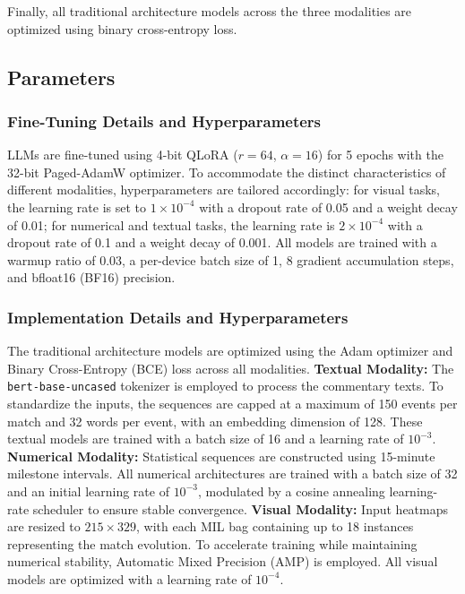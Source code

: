 Finally, all traditional architecture models across the three modalities are optimized using binary cross-entropy loss.


\subsection{Parameters}
\label{app:parameters}

\subsubsection{Fine-Tuning Details and Hyperparameters}
LLMs are fine-tuned using 4-bit QLoRA ($r=64$, $\alpha=16$) for 5 epochs with the 32-bit Paged-AdamW optimizer. To accommodate the distinct characteristics of different modalities, hyperparameters are tailored accordingly: for visual tasks, the learning rate is set to $1\times10^{-4}$ with a dropout rate of 0.05 and a weight decay of 0.01; for numerical and textual tasks, the learning rate is $2\times10^{-4}$ with a dropout rate of 0.1 and a weight decay of 0.001. All models are trained with a warmup ratio of 0.03, a per-device batch size of 1, 8 gradient accumulation steps, and bfloat16 (BF16) precision.


\subsubsection{Implementation Details and Hyperparameters}
The traditional architecture models are optimized using the Adam optimizer and Binary Cross-Entropy (BCE) loss across all modalities. \textbf{Textual Modality:} The \texttt{bert-base-uncased} tokenizer is employed to process the commentary texts. To standardize the inputs, the sequences are capped at a maximum of 150 events per match and 32 words per event, with an embedding dimension of 128. These textual models are trained with a batch size of 16 and a learning rate of $10^{-3}$. \textbf{Numerical Modality:} Statistical sequences are constructed using 15-minute milestone intervals. All numerical architectures are trained with a batch size of 32 and an initial learning rate of $10^{-3}$, modulated by a cosine annealing learning-rate scheduler to ensure stable convergence. \textbf{Visual Modality:} Input heatmaps are resized to $215 \times 329$, with each MIL bag containing up to 18 instances representing the match evolution. To accelerate training while maintaining numerical stability, Automatic Mixed Precision (AMP) is employed. All visual models are optimized with a learning rate of $10^{-4}$.

